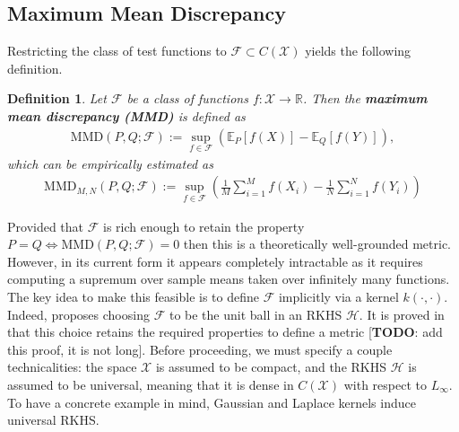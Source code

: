 \documentclass[12pt]{article}
\newcommand{\E}{\mathbb{E}}
\newcommand{\R}{\mathbb{R}}
\newcommand{\MMD}{\text{MMD}}
\newcommand{\MMDSpace}{\mathcal{F}}
\newtheorem{definition}{Definition}
\begin{document}
\subsection{Maximum Mean Discrepancy}
Restricting the class of test functions to $\mathcal{F} \subset C(\mathcal{X})$ yields the following definition.

\begin{definition}
Let $\mathcal{F}$ be a class of functions $f: \mathcal{X} \to \R$. Then the \textbf{maximum mean discrepancy (MMD)} is defined as 
\begin{align}
\MMD(P, Q; \MMDSpace) := \sup_{f \in \mathcal{F}} \left(\E_P[f(X)] - \E_Q[f(Y)]\right),
\end{align}
which can be empirically estimated as 
\begin{align}
\MMD_{M,N}(P, Q; \MMDSpace) := \sup_{f \in \mathcal{F}} \left(\frac{1}{M} \sum_{i = 1}^{M} f(X_i) - \frac{1}{N} \sum_{i = 1}^{N} f(Y_i)\right)
\end{align}
\end{definition}

Provided that $\mathcal{F}$ is rich enough to retain the property $P = Q \iff \MMD(P, Q; \MMDSpace) = 0$ then this is a theoretically well-grounded metric. However, in its current form 
it appears completely intractable as it requires computing a supremum over sample means taken over infinitely many functions. The key idea to make this 
feasible is to define $\mathcal{F}$ implicitly via a kernel $k(\cdot, \cdot)$. Indeed, \cite{Gretton1} proposes choosing $\mathcal{F}$ to be the unit ball in an RKHS 
$\mathcal{H}$. It is proved in \cite{Gretton2} that this choice retains the required properties to define a metric [\textbf{TODO}: add this proof, it is not long]. 
Before proceeding, we must specify a couple technicalities: the space $\mathcal{X}$ is assumed to be compact, and 
the RKHS $\mathcal{H}$ is assumed to be universal, meaning that it is dense in $C(\mathcal{X})$ with respect to $L_\infty$. To have a concrete example in mind,
Gaussian and Laplace kernels induce universal RKHS. 
\end{document}

